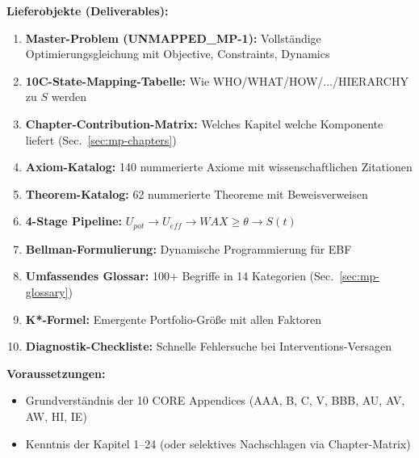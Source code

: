 \begin{tcolorbox}[colback=orange!5!white, colframe=orange!75!black,
    title=\textbf{Appendix Scope: Ziel / In-Scope / Out-of-Scope / Lieferobjekte}]
\vspace{0.5em}
\textbf{Lieferobjekte (Deliverables):}
\begin{enumerate}[nosep]
    \item \textbf{Master-Problem (UNMAPPED_MP-1):} Vollständige Optimierungsgleichung mit Objective, Constraints, Dynamics
    \item \textbf{10C-State-Mapping-Tabelle:} Wie WHO/WHAT/HOW/.../HIERARCHY zu $S$ werden
    \item \textbf{Chapter-Contribution-Matrix:} Welches Kapitel welche Komponente liefert (Sec.~\ref{sec:mp-chapters})
    \item \textbf{Axiom-Katalog:} 140 nummerierte Axiome mit wissenschaftlichen Zitationen
    \item \textbf{Theorem-Katalog:} 62 nummerierte Theoreme mit Beweisverweisen
    \item \textbf{4-Stage Pipeline:} $U_{pot} \to U_{eff} \to WAX \geq \theta \to S(t)$
    \item \textbf{Bellman-Formulierung:} Dynamische Programmierung für EBF
    \item \textbf{Umfassendes Glossar:} 100+ Begriffe in 14 Kategorien (Sec.~\ref{sec:mp-glossary})
    \item \textbf{K*-Formel:} Emergente Portfolio-Größe mit allen Faktoren
    \item \textbf{Diagnostik-Checkliste:} Schnelle Fehlersuche bei Interventions-Versagen
\end{enumerate}

\vspace{0.5em}
\textbf{Voraussetzungen:}
\begin{itemize}[nosep]
    \item Grundverständnis der 10 CORE Appendices (AAA, B, C, V, BBB, AU, AV, AW, HI, IE)
    \item Kenntnis der Kapitel 1--24 (oder selektives Nachschlagen via Chapter-Matrix)
\end{itemize}

\end{tcolorbox}


